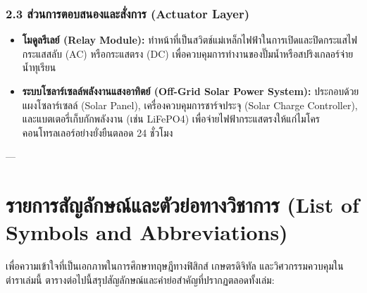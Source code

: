 \documentclass[11pt,a4paper,openany]{report}
\begin{document}
\subsubsection{2.3 ส่วนการตอบสนองและสั่งการ (Actuator Layer)}

\begin{itemize}
  \item \textbf{โมดูลรีเลย์ (Relay Module):} ทำหน้าที่เป็นสวิตช์แม่เหล็กไฟฟ้าในการเปิดและปิดกระแสไฟกระแสสลับ (AC) หรือกระแสตรง (DC) เพื่อควบคุมการทำงานของปั๊มน้ำหรือสปริงเกลอร์จ่ายน้ำทุเรียน
  \item \textbf{ระบบโซลาร์เซลล์พลังงานแสงอาทิตย์ (Off-Grid Solar Power System):} ประกอบด้วยแผงโซลาร์เซลล์ (Solar Panel), เครื่องควบคุมการชาร์จประจุ (Solar Charge Controller), และแบตเตอรี่เก็บกักพลังงาน (เช่น LiFePO4) เพื่อจ่ายไฟฟ้ากระแสตรงให้แก่ไมโครคอนโทรลเลอร์อย่างยั่งยืนตลอด 24 ชั่วโมง
\end{itemize}


---

\section{รายการสัญลักษณ์และตัวย่อทางวิชาการ (List of Symbols and Abbreviations)}


เพื่อความเข้าใจที่เป็นเอกภาพในการศึกษาทฤษฎีทางฟิสิกส์ เกษตรดิจิทัล และวิศวกรรมควบคุมในตำราเล่มนี้ ตารางต่อไปนี้สรุปสัญลักษณ์และคำย่อสำคัญที่ปรากฏตลอดทั้งเล่ม:
\end{document}
